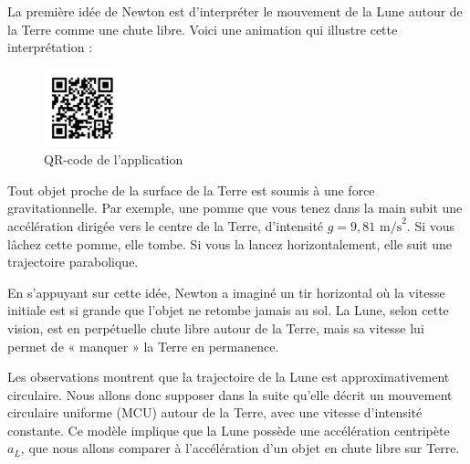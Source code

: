 \documentclass[
  letterpaper,
  DIV=11,
  numbers=noendperiod]{scrartcl}
\theoremstyle{definition}
\theoremstyle{definition}
\theoremstyle{definition}
\theoremstyle{remark}
\begin{document}
La première idée de Newton est d'interpréter le mouvement de la Lune
autour de la Terre comme une chute libre. Voici une animation qui
illustre cette interprétation :

\begin{figure}[H]

{\centering \includegraphics[width=0.2\textwidth,height=\textheight]{figures/grav/sat.pdf}

}

\caption{QR-code de l'application}

\end{figure}%

Tout objet proche de la surface de la Terre est soumis à une force
gravitationnelle. Par exemple, une pomme que vous tenez dans la main
subit une accélération dirigée vers le centre de la Terre, d'intensité
\(g = 9,81\text{ m/s}^2\). Si vous lâchez cette pomme, elle tombe. Si
vous la lancez horizontalement, elle suit une trajectoire parabolique.

En s'appuyant sur cette idée, Newton a imaginé un tir horizontal où la
vitesse initiale est si grande que l'objet ne retombe jamais au sol. La
Lune, selon cette vision, est en perpétuelle chute libre autour de la
Terre, mais sa vitesse lui permet de « manquer » la Terre en permanence.

Les observations montrent que la trajectoire de la Lune est
approximativement circulaire. Nous allons donc supposer dans la suite
qu'elle décrit un mouvement circulaire uniforme (MCU) autour de la
Terre, avec une vitesse d'intensité constante. Ce modèle implique que la
Lune possède une accélération centripète \(a_L\), que nous allons
comparer à l'accélération d'un objet en chute libre sur Terre.
\end{document}
